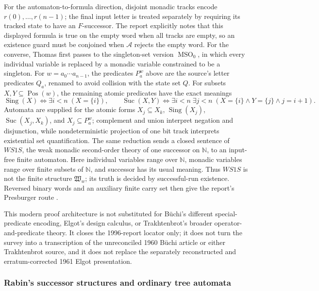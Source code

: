 For the automaton-to-formula direction, disjoint monadic tracks encode
\(r(0),\ldots,r(n-1)\); the final input letter is treated separately by requiring
its tracked state to have an \(F\)-successor.  The report explicitly notes that
this displayed formula is true on the empty word when all tracks are empty, so
an existence guard must be conjoined when \(\mathcal A\) rejects the empty word.
For the converse, Thomas first passes to the singleton-set version
\(\operatorname{MSO}_0\), in which every individual variable is replaced by a
monadic variable constrained to be a singleton.  For
\(w=a_0\cdots a_{n-1}\), the predicates \(P_a^w\) above are the source's
letter predicates \(Q_a\), renamed to avoid collision with the state set
\(Q\).  For subsets \(X,Y\subseteq\operatorname{Pos}(w)\), the remaining
atomic predicates have the exact meanings
\[
 \operatorname{Sing}(X)\Longleftrightarrow
   \exists i<n\;(X=\{i\}),
 \qquad
 \operatorname{Suc}(X,Y)\Longleftrightarrow
   \exists i<n\;\exists j<n\;
      (X=\{i\}\land Y=\{j\}\land j=i+1).
\]
Automata are supplied for the atomic forms
\(X_j\subseteq X_k\), \(\operatorname{Sing}(X_j)\),
\(\operatorname{Suc}(X_j,X_k)\), and \(X_j\subseteq P_a^w\); complement and union
interpret negation and disjunction, while nondeterministic projection of one
bit track interprets existential set quantification.  The same reduction sends
a closed sentence of \(WS1S\), the weak monadic second-order theory of one
successor on \(\mathbb N\), to an input-free finite automaton.  Here individual
variables range over \(\mathbb N\), monadic variables range over finite subsets
of \(\mathbb N\), and successor has its usual meaning.  Thus \(WS1S\) is not
the finite structure \(\mathfrak W_w\); its truth is decided by successful-run
existence.
Reversed binary words and an auxiliary finite carry set then give the report's
Presburger route
\cite[pp.~8--12]{Thomas1996Report}.

This modern proof architecture is not substituted for B\"uchi's different
special-predicate encoding, Elgot's design calculus, or Trakhtenbrot's broader
operator-and-predicate theory.  It closes the 1996-report locator only; it does
not turn the survey into a transcription of the unreconciled 1960 B\"uchi
article or either Trakhtenbrot source, and it does not replace the separately
reconstructed and erratum-corrected 1961 Elgot presentation.

\subsubsection{Rabin's successor structures and ordinary tree automata}

